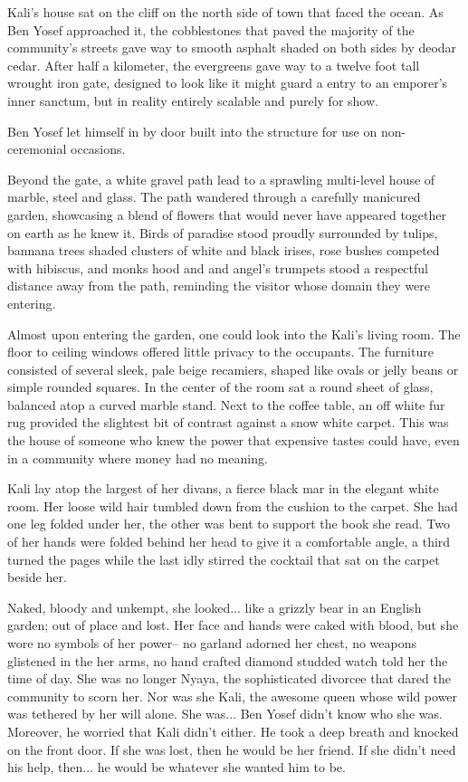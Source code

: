 \documentclass{amsart}
\begin{document}
Kali's house sat on the cliff on the north side of town that faced the ocean. As Ben Yosef approached it, the cobblestones that paved the majority of the community's streets gave way to smooth asphalt shaded on both sides by deodar cedar. After half a kilometer, the evergreens gave way to a twelve foot tall wrought iron gate, designed to look like it might guard a entry to an emporer's inner sanctum, but in reality entirely scalable and purely for show.

Ben Yosef let himself in by door built into the structure for use on non-ceremonial occasions. 

Beyond the gate, a white gravel path lead to a sprawling multi-level house of marble, steel and glass. The path wandered through a carefully manicured garden, showcasing a blend of flowers that would never have appeared together on earth as he knew it. Birds of paradise stood proudly surrounded by tulips, bannana trees shaded clusters of white and black irises, rose bushes competed with hibiscus, and monks hood and and angel's trumpets stood a respectful distance away from the path, reminding the visitor whose domain they were entering.

Almost upon entering the garden, one could look into the Kali's living room. The floor to ceiling windows offered little privacy to the occupants. The furniture consisted of several sleek, pale beige recamiers, shaped like ovals or jelly beans or simple rounded squares. In the center of the room sat a round sheet of glass, balanced atop a curved marble stand. Next to the coffee table, an off white fur rug provided the slightest bit of contrast against a snow white carpet. This was the house of someone who knew the power that expensive tastes could have, even in a community where money had no meaning.

Kali lay atop the largest of her divans, a fierce black mar in the elegant white room. Her loose wild hair tumbled down from the cushion to the carpet. She had one leg folded under her, the other was bent to support the book she read. Two of her hands were folded behind her head to give it a comfortable angle, a third turned the pages while the last idly stirred the cocktail that sat on the carpet beside her.

Naked, bloody and unkempt, she looked... like a grizzly bear in an English garden; out of place and lost. Her face and hands were caked with blood, but she wore no symbols of her power-- no garland adorned her chest, no weapons glistened in the her arms, no hand crafted diamond studded watch told her the time of day. She was no longer Nyaya, the sophisticated divorcee that dared the community to scorn her. Nor was she Kali, the awesome queen whose wild power was tethered by her will alone. She was... Ben Yosef didn't know who she was. Moreover, he worried that Kali didn't either. He took a deep breath and knocked on the front door. If she was lost, then he would be her friend. If she didn't need his help, then... he would be whatever she wanted him to be.
\end{document}
